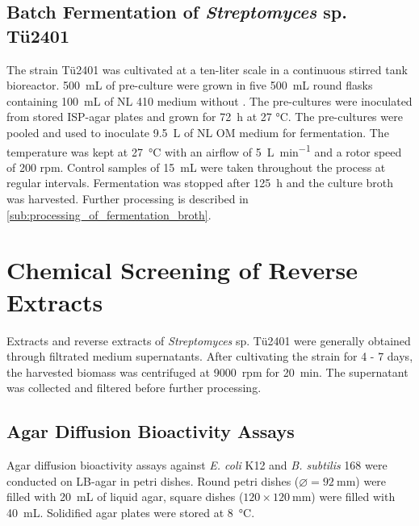 	\subsection{Batch Fermentation of \emph{Streptomyces} sp. Tü2401} %
	\label{sub:fermentation}
	The strain T\"u2401 was cultivated at a ten-liter scale in a continuous stirred tank bioreactor. \SI{500}{\milli\liter} of pre-culture were grown in five \SI{500}{\milli\liter} round flasks containing \SI{100}{\milli\liter} of NL 410 medium without . The pre-cultures were inoculated from stored ISP-agar plates and grown for \SI{72}{\hour} at 27 \si{\celsius}. The pre-cultures were pooled and used to inoculate \SI{9.5}{\liter} of NL OM medium for fermentation. The temperature was kept at \SI{27}{\celsius} with an airflow of \SI{5}{\liter\per\minute} and a rotor speed of 200 rpm. Control samples of \SI{15}{\milli\liter} were taken throughout the process at regular intervals. Fermentation was stopped after \SI{125}{\hour} and the culture broth was harvested. Further processing is described in \ref{sub:processing_of_fermentation_broth}.
	


\clearpage

\section{Chemical Screening of Reverse Extracts} %
\label{sec:chemical_screening_of_reverse_extracts}

Extracts and reverse extracts of \emph{Streptomyces} sp. Tü2401 were generally obtained through filtrated medium supernatants. After  cultivating the strain for 4 - 7 days, the harvested biomass was centrifuged at 9000~rpm for \SI{20}{\minute}. The supernatant was collected and filtered before further processing.

	\subsection{Agar Diffusion Bioactivity Assays} %
	\label{sub:agar_diffusion_bioactivity_assays}

	Agar diffusion bioactivity assays against \emph{E. coli} K12 and \emph{B. subtilis} 168 were conducted on LB-agar in petri dishes. Round petri dishes ($\varnothing=\SI{92}{\milli\meter}$) were filled with \SI{20}{\milli\liter} of liquid agar, square dishes ($120\times \SI{120}{\milli\meter}$) were filled with \SI{40}{\milli\liter}. Solidified agar plates were stored at \SI{8}{\celsius}.

